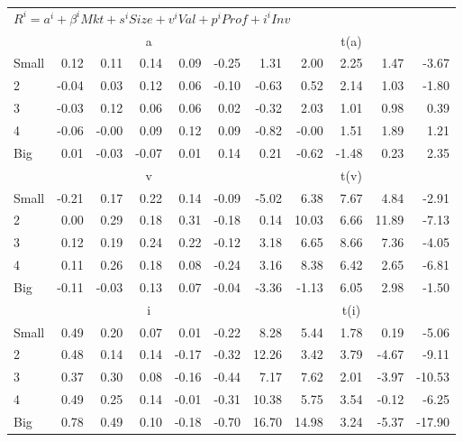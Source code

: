 \begin{tabular}{lrrrrrrrrrr}
    
  \midrule
  \multicolumn{11}{l}{$R^i=a^i+\beta^iMkt+s^iSize+v^iVal+p^iProf+i^iInv$}  \\
  
     & \multicolumn{5}{c}{a} & \multicolumn{5}{c}{t(a)}   \\
     \cmidrule(r){2-6} \cmidrule(r){7-11} 
    Small  & 0.12  & 0.11  & 0.14  & 0.09  & -0.25  & 1.31  & 2.00  & 2.25  & 1.47  & -3.67   \\
    2  & -0.04  & 0.03  & 0.12  & 0.06  & -0.10  & -0.63  & 0.52  & 2.14  & 1.03  & -1.80   \\
    3  & -0.03  & 0.12  & 0.06  & 0.06  & 0.02  & -0.32  & 2.03  & 1.01  & 0.98  & 0.39   \\
    4  & -0.06  & -0.00  & 0.09  & 0.12  & 0.09  & -0.82  & -0.00  & 1.51  & 1.89  & 1.21   \\
    Big  & 0.01  & -0.03  & -0.07  & 0.01  & 0.14  & 0.21  & -0.62  & -1.48  & 0.23  & 2.35   \\
    

     & \multicolumn{5}{c}{v} & \multicolumn{5}{c}{t(v)}   \\
     \cmidrule(r){2-6} \cmidrule(r){7-11} 
    Small  & -0.21  & 0.17  & 0.22  & 0.14  & -0.09  & -5.02  & 6.38  & 7.67  & 4.84  & -2.91   \\
    2  & 0.00  & 0.29  & 0.18  & 0.31  & -0.18  & 0.14  & 10.03  & 6.66  & 11.89  & -7.13   \\
    3  & 0.12  & 0.19  & 0.24  & 0.22  & -0.12  & 3.18  & 6.65  & 8.66  & 7.36  & -4.05   \\
    4  & 0.11  & 0.26  & 0.18  & 0.08  & -0.24  & 3.16  & 8.38  & 6.42  & 2.65  & -6.81   \\
    Big  & -0.11  & -0.03  & 0.13  & 0.07  & -0.04  & -3.36  & -1.13  & 6.05  & 2.98  & -1.50   \\
  

     & \multicolumn{5}{c}{i} & \multicolumn{5}{c}{t(i)}   \\
     \cmidrule(r){2-6} \cmidrule(r){7-11} 
    Small  & 0.49  & 0.20  & 0.07  & 0.01  & -0.22  & 8.28  & 5.44  & 1.78  & 0.19  & -5.06   \\
    2  & 0.48  & 0.14  & 0.14  & -0.17  & -0.32  & 12.26  & 3.42  & 3.79  & -4.67  & -9.11   \\
    3  & 0.37  & 0.30  & 0.08  & -0.16  & -0.44  & 7.17  & 7.62  & 2.01  & -3.97  & -10.53   \\
    4  & 0.49  & 0.25  & 0.14  & -0.01  & -0.31  & 10.38  & 5.75  & 3.54  & -0.12  & -6.25   \\
    Big  & 0.78  & 0.49  & 0.10  & -0.18  & -0.70  & 16.70  & 14.98  & 3.24  & -5.37  & -17.90   \\
    
  \bottomrule
\end{tabular}

